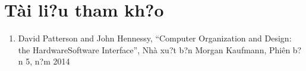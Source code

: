 

\chapter{Tài li?u tham kh?o}
\begin{enumerate}
\item David Patterson and John Hennessy, ``Computer Organization and Design: the Hardware\/Software Interface'', Nhà xu?t b?n Morgan Kaufmann, Phiên b?n 5, n?m 2014
\end{enumerate}